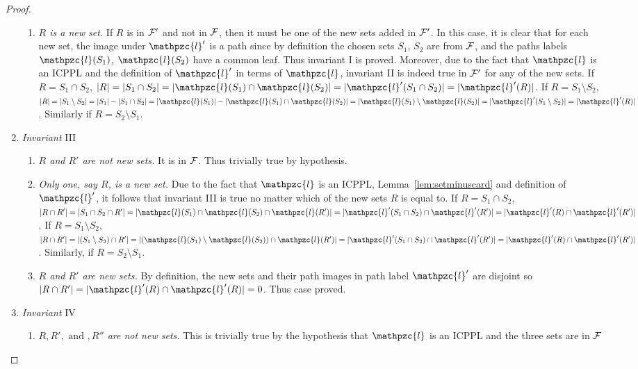 \documentclass[envcountsect, envcountsame, 11pt]{../lib/llncs2e/llncs}
\def\cF{{\cal F}}
\def\cl{\mathpzc{l}}
\begin{document}
\begin{proof}
\begin{enumerate}[\textreferencemark]
\begin{enumerate}[{\bf a.}]
    \item {\em $R$ is a new set.} If $R$ is in $\cF'$ and not in
      $\cF$, then it must be one of the new sets added in
      $\cF'$. In this case, it is clear that for each new set, the
      image under $\cl'$ is a path since by definition the chosen
      sets $S_1$, $S_2$ are from $\cF$, and the paths labels  $\cl(S_1)$, $\cl(S_2)$ have a
      common leaf. Thus invariant I is proved.
      Moreover, due to the fact that $\cl$ is an ICPPL  and the
      definition of $\cl'$ in terms of $\cl$, invariant II is
      indeed true in $\cF'$ for any of the new sets.  If
      $R = S_1 \cap S_2$, $|R| = |S_1 \cap S_2| = |\cl(S_1) \cap
      \cl(S_2)| = |\cl'(S_1 \cap S_2)| = |\cl'(R)|$.
      If $R = S_1 \setminus S_2$, $|R| = |S_1 \setminus S_2| = |S_1| -
      |S_1 \cap S_2| = |\cl(S_1)| - |\cl(S_1) \cap
      \cl(S_2)| = |\cl(S_1) \setminus \cl(S_2)| =
      |\cl'(S_1 \setminus S_2)|
      = |\cl'(R)|$. Similarly if $R = S_2 \setminus S_1$.
    \end{enumerate}
  \item {\em Invariant} III
    \begin{enumerate}[{\bf a.}]
    \item {\em $R$ and $R'$ are not new sets.} It is in
      $\cF$. Thus trivially true by hypothesis.
    \item {\em Only one, say $R$, is a new set.} Due to the fact that $\cl$ is an ICPPL, Lemma~\ref{lem:setminuscard} and
      definition of $\cl'$, it follows that invariant III is true no
      matter which of the new sets $R$ is equal to. If $R = S_1 \cap
      S_2$, $|R \cap R'| = |S_1 \cap S_2 \cap R'| = |\cl(S_1)
      \cap \cl(S_2) \cap \cl(R')| = |\cl'(S_1 \cap S_2)
      \cap \cl'(R')| = |\cl'(R) \cap \cl'(R')|$.  If $R = S_1
      \setminus S_2$, $|R \cap R'| = |(S_1 \setminus S_2) \cap R'| =
      |(\cl(S_1) \setminus \cl(S_2)) \cap \cl(R')| =
      |\cl'(S_1 \cap S_2) \cap \cl'(R')| = |\cl'(R) \cap
      \cl'(R')|$. Similarly, if $R = S_2 \setminus
      S_1$. 
    \item {\em $R$ and $R'$ are new sets.} By definition, the new
      sets and their path images in path label $\cl'$ are disjoint so
      $|R \cap R'| = |\cl'(R) \cap \cl'(R)| = 0$. Thus case proved.
    \end{enumerate}
  \item {\em Invariant} IV
  \begin{enumerate}[{\bf a.}]
  \item {\em $R, R', \text{ and }, R''$ are not new sets.} This is trivially true by the hypothesis that $\cl$ is an ICPPL and the three sets are in $\cF$

\end{enumerate}
\end{enumerate}
\end{proof}
\end{document}
